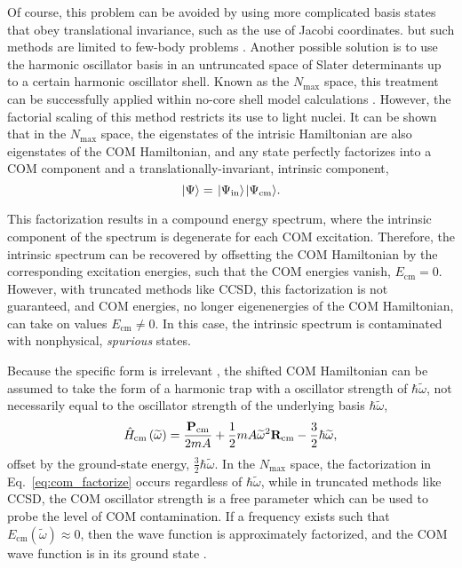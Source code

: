 \documentclass[thesis.tex]{subfiles}
\begin{document}
Of course, this problem can be avoided by using more complicated basis states that obey translational invariance, such as the use of Jacobi coordinates. but such methods are limited to few-body problems \cite{BISHOP19901341,NOGGA2002054003}.  Another possible solution is to use the harmonic oscillator basis in an untruncated space of Slater determinants up to a certain harmonic oscillator shell.  Known as the $N_{\mathrm{max}}$ space, this treatment can be successfully applied within no-core shell model calculations \cite{NAVRATIL2009083101}. However, the factorial scaling of this method restricts its use to light nuclei.  It can be shown that in the $N_{\mathrm{max}}$ space, the eigenstates of the intrisic Hamiltonian are also eigenstates of the COM Hamiltonian, and any state perfectly factorizes into a COM component and a translationally-invariant, intrinsic component,
\begin{equation} \label{eq:com_factorize}
  \hspace{1pt}\lvert \Psi \rangle = \hspace{1pt}\lvert \Psi_{\mathrm{in}} \rangle\hspace{1pt}\lvert \Psi_{\mathrm{cm}} \rangle.
\end{equation}

This factorization results in a compound energy spectrum, where the intrinsic component of the spectrum is degenerate for each COM excitation.  Therefore, the intrinsic spectrum can be recovered by offsetting the COM Hamiltonian by the corresponding excitation energies, such that the COM energies vanish, $E_{\mathrm{cm}} = 0$.  However, with truncated methods like CCSD, this factorization is not guaranteed, and COM energies, no longer eigenenergies of the COM Hamiltonian, can take on values $E_{\mathrm{cm}} \neq 0$.  In this case, the intrinsic spectrum is contaminated with nonphysical, \textit{spurious} states.

Because the specific form is irrelevant \cite{VINCENT2973}, the shifted COM Hamiltonian can be assumed to take the form of a harmonic trap with a oscillator strength of $\hbar\widetilde{\omega}$, not necessarily equal to the oscillator strength of the underlying basis $\hbar\widetilde{\omega}$,
\begin{equation} \label{eq:com_hamiltonian}
  \hat{H}\hspace{-1pt}_{\mathrm{cm}}\left(\widetilde{\omega}\right) = \frac{\mathbf{P}_{\mathrm{cm}}}{2mA} + \frac{1}{2}mA\widetilde{\omega}^{2}\mathbf{R}_{\mathrm{cm}} - \frac{3}{2}\hbar\widetilde{\omega},
\end{equation}
offset by the ground-state energy, $\frac{3}{2}\hbar\widetilde{\omega}$.  In the $N_{\mathrm{max}}$ space, the factorization in Eq.\ \eqref{eq:com_factorize} occurs regardless of $\hbar\widetilde{\omega}$, while in truncated methods like CCSD, the COM oscillator strength is a free parameter which can be used to probe the level of COM contamination.  If a frequency exists such that $E_{\mathrm{cm}}\left(\widetilde{\omega}\right) \approx 0$, then the wave function is approximately factorized, and the COM wave function is in its ground state \cite{HAGEN2009062503,JANSEN2013}.
\end{document}
